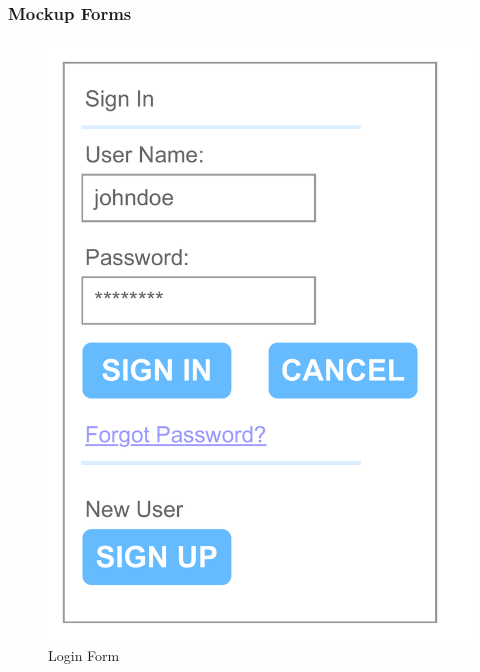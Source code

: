 \documentclass{article}
\begin{document}
        \subsubsection{Mockup Forms}
        \begin{multicols}{3}
                \begin{figure}[H]
                        \centering
                        \includegraphics[width = 0.9\columnwidth]{images/design/Login_Form.pdf}
                        \caption{Login Form}
                \end{figure}
                \begin{figure}[H]
                        \centering

\end{figure}
\end{multicols}
\end{document}
